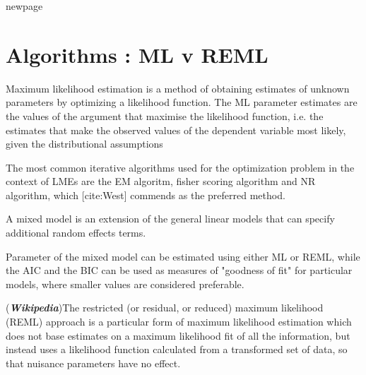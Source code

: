 \documentclass[12pt, a4paper]{report}
\theoremstyle{plain}
\theoremstyle{definition}
\theoremstyle{remark}
\begin{document}
	
	
	
	
	
	newpage
	
	\section{Algorithms : ML v REML}
	Maximum likelihood estimation is a method of obtaining estimates of unknown parameters by optimizing a likelihood function. The ML
	parameter estimates are the values of the argument that maximise the likelihood function, i.e. the estimates that make the observed
	values of the dependent variable most likely, given the distributional assumptions
	
	The most common iterative algorithms used for the optimization
	problem in the context of LMEs are the EM algoritm, fisher scoring
	algorithm and NR algorithm, which [cite:West] commends as the
	preferred method.
	
	A mixed model is an extension of the general linear models that
	can specify additional random effects terms.
	
	Parameter of the mixed model can be estimated using either ML or
	REML, while the AIC and the BIC can be used as measures of
	"goodness of fit" for particular models, where smaller values are
	considered preferable.
	
	
	(\textbf{\emph{Wikipedia}})The restricted (or residual, or reduced) maximum likelihood (REML) approach is a particular form of maximum likelihood estimation which does not base estimates on a maximum likelihood fit of all the information, but instead uses a likelihood function calculated from a transformed set of data, so that nuisance parameters have no effect.
	
\end{document}
